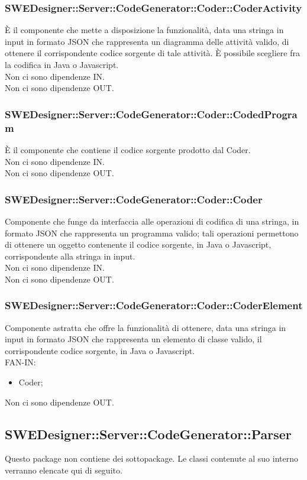 \documentclass[../PianoDiQualifica.tex]{subfiles}
\begin{document}
		\subsubsection{SWEDesigner::Server::CodeGenerator::Coder::CoderActivity}
		È il componente che mette a disposizione la funzionalità, data una stringa in input in formato JSON che rappresenta un diagramma delle attività valido, di ottenere il corrispondente codice sorgente di tale attività. È possibile scegliere fra la codifica in Java o Javascript.\\
		Non ci sono dipendenze IN.\\
		Non ci sono dipendenze OUT.
		\subsubsection{SWEDesigner::Server::CodeGenerator::Coder::CodedProgram}
		È il componente che contiene il codice sorgente prodotto dal Coder.\\
		Non ci sono dipendenze IN.\\
		Non ci sono dipendenze OUT.
		\subsubsection{SWEDesigner::Server::CodeGenerator::Coder::Coder}
		Componente che funge da interfaccia alle operazioni di codifica di una stringa, in formato JSON che rappresenta un programma valido; tali operazioni permettono di ottenere un oggetto contenente il codice sorgente, in Java o Javascript, corrispondente alla stringa in input.\\
		Non ci sono dipendenze IN.\\
		Non ci sono dipendenze OUT.
		\subsubsection{SWEDesigner::Server::CodeGenerator::Coder::CoderElement}
		Componente astratta che offre la funzionalità di ottenere, data una stringa in input in formato JSON che rappresenta un elemento di classe valido, il corrispondente codice sorgente, in Java o Javascript.\\
		FAN-IN:
		\begin{itemize}
			\item Coder;
		\end{itemize}
		Non ci sono dipendenze OUT.
		\subsection{SWEDesigner::Server::CodeGenerator::Parser}
		Questo package non contiene dei sottopackage.
		Le classi contenute al suo interno verranno elencate qui di seguito.
\end{document}
